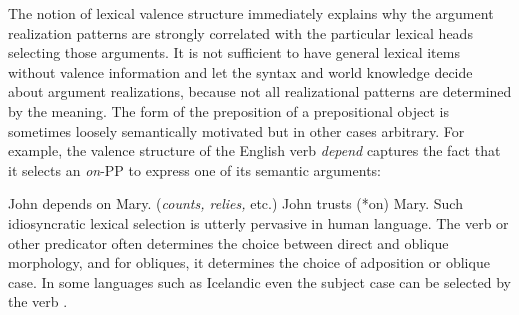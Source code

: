 \begin{exe}
\begin{xlist}[iv.]
\begin{exe}
\begin{xlist}[iv.]
The notion of lexical valence structure immediately explains why the argument realization patterns
are strongly correlated with the particular lexical heads selecting those arguments.  
It is not sufficient to have general lexical items without valence information
and let the syntax and world knowledge decide about argument realizations, 
because not all 
realizational patterns are determined by the meaning. 
The form of the preposition of a prepositional object is sometimes loosely semantically motivated but in
other cases arbitrary.  For example, the valence structure of the English verb \emph{depend} captures the fact that it selects an \emph{on}-PP to express one of its semantic arguments: 

\eal\label{depends-on-ex}
\ex John depends on Mary.  (\emph{counts, relies,} etc.)
\ex John trusts (*on) Mary.  
\ex 
{}
\zl
Such idiosyncratic lexical selection is utterly pervasive in human language.  The verb or other
predicator often determines the choice between direct and oblique morphology, and for obliques, it
determines the choice of adposition or oblique case.  In some languages such as Icelandic even the
subject case can be selected by the verb \citep*{ZMT85a}.


\end{xlist}
\end{exe}
\end{xlist}
\end{exe}
